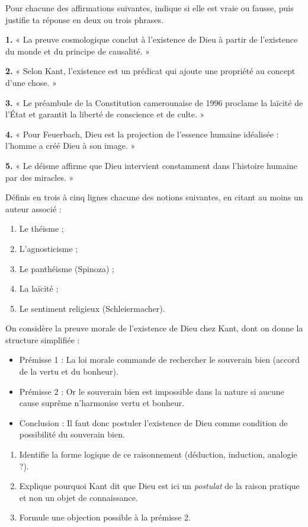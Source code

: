 \documentclass[11pt]{article}
\newcommand{\cle}[1]{{\popxbold\color{popdark}#1}}
\begin{document}
\begin{exercice}
Pour chacune des affirmations suivantes, indique si elle est vraie ou fausse, puis justifie ta réponse en deux ou trois phrases.

\textbf{1.} « La preuve cosmologique conclut à l'existence de Dieu à partir de l'existence du monde et du principe de causalité. »

\textbf{2.} « Selon Kant, l'existence est un prédicat qui ajoute une propriété au concept d'une chose. »

\textbf{3.} « Le préambule de la Constitution camerounaise de 1996 proclame la laïcité de l'État et garantit la liberté de conscience et de culte. »

\textbf{4.} « Pour Feuerbach, Dieu est la projection de l'essence humaine idéalisée : l'homme a créé Dieu à son image. »

\textbf{5.} « Le déisme affirme que Dieu intervient constamment dans l'histoire humaine par des miracles. »
\end{exercice}

\begin{exercice}[Définitions]
Définis en trois à cinq lignes chacune des notions suivantes, en citant au moins un auteur associé :
\begin{enumerate}
\item Le \cle{théisme} ;
\item L'\cle{agnosticisme} ;
\item Le \cle{panthéisme} (Spinoza) ;
\item La \cle{laïcité} ;
\item Le \cle{sentiment religieux} (Schleiermacher).
\end{enumerate}
\end{exercice}

\begin{exercice}
On considère la preuve morale de l'existence de Dieu chez Kant, dont on donne la structure simplifiée :
\begin{itemize}
\item Prémisse 1 : La loi morale commande de rechercher le souverain bien (accord de la vertu et du bonheur).
\item Prémisse 2 : Or le souverain bien est impossible dans la nature si aucune cause suprême n'harmonise vertu et bonheur.
\item Conclusion : Il faut donc postuler l'existence de Dieu comme condition de possibilité du souverain bien.
\end{itemize}
\begin{enumerate}
\item Identifie la forme logique de ce raisonnement (déduction, induction, analogie ?).
\item Explique pourquoi Kant dit que Dieu est ici un \emph{postulat} de la raison pratique et non un objet de connaissance.
\item Formule une objection possible à la prémisse 2.
\end{enumerate}
\end{exercice}
\end{document}
